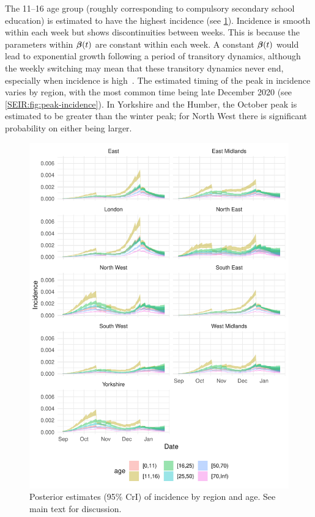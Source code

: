 \documentclass[thesis.tex]{subfiles}
\begin{document}
The 11--16 age group (roughly corresponding to compulsory secondary school education) is estimated to have the highest incidence (see \cref{SEIR:fig:incidence}).
Incidence is smooth within each week but shows discontinuities between weeks.
This is because the parameters within $\bm{\beta}(t)$ are constant within each week.
A constant $\bm{\beta}(t)$ would lead to exponential growth following a period of transitory dynamics, although the weekly switching may mean that these transitory dynamics never end, especially when incidence is high~\autocite{rhodesConvergence}.
The estimated timing of the peak in incidence varies by region, with the most common time being late December 2020 (see \cref{SEIR:fig:peak-incidence}).
In Yorkshire and the Humber, the October peak is estimated to be greater than the winter peak; for North West there is significant probability on either being larger.
\begin{figure}
    \includegraphics{SEIR/CIS/incidence}
    \caption[Posterior estimates of incidence]{%
        Posterior estimates (95\% CrI) of incidence by region and age.
        See main text for discussion.
    }
    \label{SEIR:fig:incidence}
\end{figure}
\end{document}
